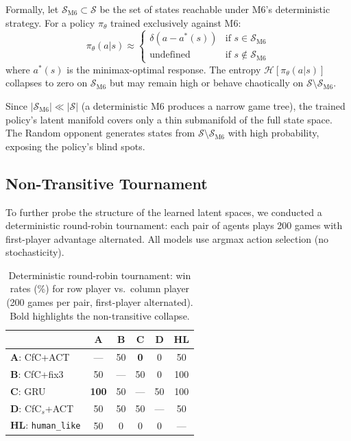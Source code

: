 \documentclass[conference]{IEEEtran}
\begin{document}
Formally, let $\mathcal{S}_{\text{M6}} \subset \mathcal{S}$ be the set of states reachable under M6's deterministic strategy. For a policy $\pi_\theta$ trained exclusively against M6:
\begin{equation}
\label{eq:hash_map}
\pi_\theta(a | s) \approx \begin{cases}
\delta(a - a^*(s)) & \text{if } s \in \mathcal{S}_{\text{M6}} \\
\text{undefined} & \text{if } s \notin \mathcal{S}_{\text{M6}}
\end{cases}
\end{equation}
where $a^*(s)$ is the minimax-optimal response. The entropy $\mathcal{H}[\pi_\theta(a | s)]$ collapses to zero on $\mathcal{S}_{\text{M6}}$ but may remain high or behave chaotically on $\mathcal{S} \setminus \mathcal{S}_{\text{M6}}$.

Since $|\mathcal{S}_{\text{M6}}| \ll |\mathcal{S}|$ (a deterministic M6 produces a narrow game tree), the trained policy's latent manifold covers only a thin submanifold of the full state space. The Random opponent generates states from $\mathcal{S} \setminus \mathcal{S}_{\text{M6}}$ with high probability, exposing the policy's blind spots.


\subsection{Non-Transitive Tournament}
\label{ssec:tournament}

To further probe the structure of the learned latent spaces, we conducted a deterministic round-robin tournament: each pair of agents plays 200 games with first-player advantage alternated. All models use argmax action selection (no stochasticity).

\begin{table}[ht]
\centering
\caption{Deterministic round-robin tournament: win rates (\%) for row player vs.\ column player (200 games per pair, first-player alternated). Bold highlights the non-transitive collapse.}
\label{tab:tournament}
\begin{tabular}{@{}l ccccc@{}}
\toprule
 & \textbf{A} & \textbf{B} & \textbf{C} & \textbf{D} & \textbf{HL} \\
\midrule
\textbf{A}: CfC+ACT    & ---  & 50  & \textbf{0}   & 0   & 50 \\
\textbf{B}: CfC+fix3   & 50   & --- & 50  & 0   & 100 \\
\textbf{C}: GRU         & \textbf{100} & 50  & --- & 50  & 100 \\
\textbf{D}: CfC$_s$+ACT & 50   & 50  & 50  & --- & 50 \\
\textbf{HL}: \texttt{human\_like} & 50   & 0   & 0   & 0   & --- \\
\bottomrule
\end{tabular}
\end{table}
\end{document}
